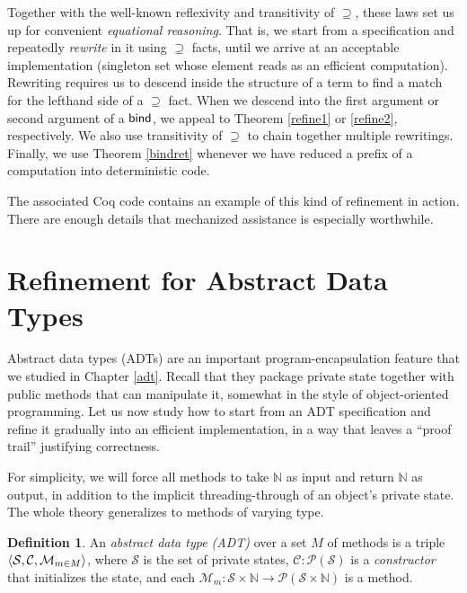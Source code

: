 \documentclass{amsbook}
\theoremstyle{definition}
\newtheorem{definition}[theorem]{Definition}
\theoremstyle{remark}
\numberwithin{section}{chapter}
\numberwithin{equation}{chapter}
\begin{document}
Together with the well-known reflexivity and transitivity of $\supseteq$, these laws set us up for convenient \emph{equational reasoning}.
That is, we start from a specification and repeatedly \emph{rewrite} in it using $\supseteq$ facts, until we arrive at an acceptable implementation (singleton set whose element reads as an efficient computation).
Rewriting requires us to descend inside the structure of a term to find a match for the lefthand side of a $\supseteq$ fact.
When we descend into the first argument or second argument of a $\mathsf{bind}$, we appeal to Theorem \ref{refine1} or \ref{refine2}, respectively.
We also use transitivity of $\supseteq$ to chain together multiple rewritings.
Finally, we use Theorem \ref{bindret} whenever we have reduced a prefix of a computation into deterministic code.

The associated Coq code contains an example of this kind of refinement in action.
There are enough details that mechanized assistance is especially worthwhile.

\section{Refinement for Abstract Data Types}

Abstract data types (ADTs) are an important program-encapsulation feature that we studied in Chapter \ref{adt}.
Recall that they package private state together with public methods that can manipulate it, somewhat in the style of object-oriented programming.
Let us now study how to start from an ADT specification and refine it gradually into an efficient implementation, in a way that leaves a ``proof trail'' justifying correctness.

For simplicity, we will force all methods to take $\mathbb N$ as input and return $\mathbb N$ as output, in addition to the implicit threading-through of an object's private state.
The whole theory generalizes to methods of varying type.

\begin{definition}
  An \emph{abstract data type (ADT)} over a set $M$ of methods is a triple ${\left \langle \mathcal S, \mathcal C, \mathcal M_{m \in M} \right \rangle}$, where $\mathcal S$ is the set of private states, $\mathcal C : \mathcal P(\mathcal S)$ is a \emph{constructor} that initializes the state, and each $\mathcal M_m : \mathcal S \times \mathbb N \to \mathcal P(\mathcal S \times \mathbb N)$ is a method.
\end{definition}
\end{document}
